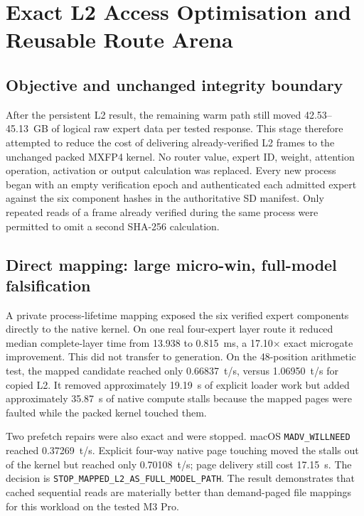 \section{Exact L2 Access Optimisation and Reusable Route Arena}
\label{sec:exact-l2-arena-20260910}

\subsection{Objective and unchanged integrity boundary}

After the persistent L2 result, the remaining warm path still moved
42.53--45.13~GB of logical raw expert data per tested response. This stage
therefore attempted to reduce the cost of delivering already-verified L2
frames to the unchanged packed MXFP4 kernel. No router value, expert ID,
weight, attention operation, activation or output calculation was replaced.
Every new process began with an empty verification epoch and authenticated
each admitted expert against the six component hashes in the authoritative SD
manifest. Only repeated reads of a frame already verified during the same
process were permitted to omit a second SHA-256 calculation.

\subsection{Direct mapping: large micro-win, full-model falsification}

A private process-lifetime mapping exposed the six verified expert components
directly to the native kernel. On one real four-expert layer route it reduced
median complete-layer time from 13.938 to 0.815~ms, a 17.10$\times$ exact
microgate improvement. This did not transfer to generation. On the
48-position arithmetic test, the mapped candidate reached only 0.66837~t/s,
versus 1.06950~t/s for copied L2. It removed approximately 19.19~s of explicit
loader work but added approximately 35.87~s of native compute stalls because
the mapped pages were faulted while the packed kernel touched them.

Two prefetch repairs were also exact and were stopped. macOS
\texttt{MADV\_WILLNEED} reached 0.37269~t/s. Explicit four-way native page
touching moved the stalls out of the kernel but reached only 0.70108~t/s; page
delivery still cost 17.15~s. The decision is
\texttt{STOP\_MAPPED\_L2\_AS\_FULL\_MODEL\_PATH}. The result demonstrates
that cached sequential reads are materially better than demand-paged file
mappings for this workload on the tested M3 Pro.

